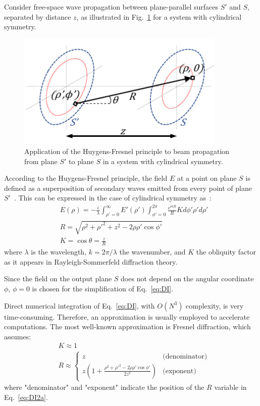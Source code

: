 Consider free-space wave propagation between plane-parallel surfaces \(S'\) and \(S\), separated by distance \(z\), as illustrated in Fig.~\ref{fig:diffraction} for a system with cylindrical symmetry.
\begin{figure}[ht] 
 \centering
 \includegraphics[width=10cm]{images/diffraction.pdf}
 \caption{Application of the Huygens-Fresnel principle to beam propagation from plane \(S'\) to plane \(S\) in a system with cylindrical symmetry.}
 \label{fig:diffraction}
\end{figure}
According to the Huygens-Fresnel principle, the field \(E\) at a point on plane \(S\) is defined as a superposition of secondary waves emitted from every point of plane \(S'\)~\cite{BornWolf:1999}. This can be expressed in the case of cylindrical symmetry as~\cite{Siegman:1986,PeatrossWare:2015}:
\begin{subequations} \label{eq:DI}
 \begin{align}
  &E(\rho) = -\frac{i}{\lambda} \int_{\rho'=0}^{\infty} E'(\rho') \int_{\phi'=0}^{2\pi} \frac{e^{ikR}}{R} K d\phi' \rho' d\rho' \label{eq:DI2a}\\
  &R = \sqrt{\rho^2 + \rho'^2 + z^2 - 2\rho\rho'\cos\phi'} \label{eq:DI2b}\\
  &K = \cos\theta = \frac{z}{R} \label{eq:DI2c}
 \end{align}
\end{subequations}
where \(\lambda\) is the wavelength, \(k = 2\pi / \lambda\) the wavenumber, and \(K\) the obliquity factor as it appears in Rayleigh-Sommerfeld diffraction theory.

Since the field on the output plane \(S\) does not depend on the angular coordinate \(\phi\), \(\phi = 0\) is chosen for the simplification of Eq.~\ref{eq:DI}.

Direct numerical integration of Eq.~\ref{eq:DI}, with \(O(N^3)\) complexity, is very time-consuming. Therefore, an approximation is usually employed to accelerate computations. The most well-known approximation is Fresnel diffraction, which assumes:
\begin{equation} \label{eq:FreA}
 \begin{split}
  &K \approx 1\\
  &R \approx
  \begin{cases}
   z & \text{(denominator)}\\
   z \left(1 + \frac{\rho^2 + \rho'^2 - 2\rho\rho'\cos\phi'}{2z^2}\right) & \text{(exponent)}
  \end{cases}
 \end{split}
\end{equation}
where "denominator" and "exponent" indicate the position of the \(R\) variable in Eq.~\ref{eq:DI2a}.

